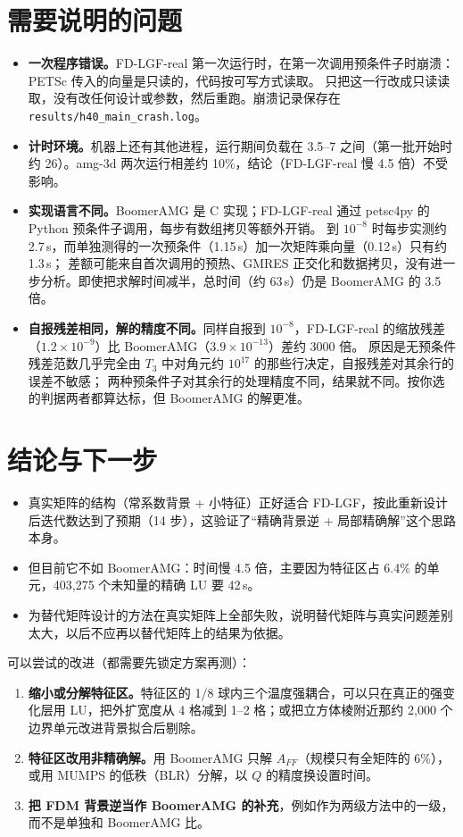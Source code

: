 \documentclass[11pt,a4paper]{ctexart}
\begin{document}
\section{需要说明的问题}
\begin{itemize}
\item \textbf{一次程序错误。}FD-LGF-real 第一次运行时，在第一次调用预条件子时崩溃：PETSc 传入的向量是只读的，代码按可写方式读取。
只把这一行改成只读读取，没有改任何设计或参数，然后重跑。崩溃记录保存在 \texttt{results/h40\_main\_crash.log}。
\item \textbf{计时环境。}机器上还有其他进程，运行期间负载在 3.5--7 之间（第一批开始时约 26）。amg-3d 两次运行相差约 10\%，结论（FD-LGF-real 慢 4.5 倍）不受影响。
\item \textbf{实现语言不同。}BoomerAMG 是 C 实现；FD-LGF-real 通过 petsc4py 的 Python 预条件子调用，每步有数组拷贝等额外开销。
到 $10^{-8}$ 时每步实测约 2.7\,s，而单独测得的一次预条件（1.15\,s）加一次矩阵乘向量（0.12\,s）只有约 1.3\,s；
差额可能来自首次调用的预热、GMRES 正交化和数据拷贝，没有进一步分析。即使把求解时间减半，总时间（约 63\,s）仍是 BoomerAMG 的 3.5 倍。
\item \textbf{自报残差相同，解的精度不同。}同样自报到 $10^{-8}$，FD-LGF-real 的缩放残差（$1.2\times10^{-9}$）比 BoomerAMG（$3.9\times10^{-13}$）差约 3000 倍。
原因是无预条件残差范数几乎完全由 $T_3$ 中对角元约 $10^{17}$ 的那些行决定，自报残差对其余行的误差不敏感；
两种预条件子对其余行的处理精度不同，结果就不同。按你选的判据两者都算达标，但 BoomerAMG 的解更准。
\end{itemize}

\section{结论与下一步}
\begin{itemize}
\item 真实矩阵的结构（常系数背景 + 小特征）正好适合 FD-LGF，按此重新设计后迭代数达到了预期（14 步），这验证了“精确背景逆 + 局部精确解”这个思路本身。
\item 但目前它不如 BoomerAMG：时间慢 4.5 倍，主要因为特征区占 6.4\% 的单元，403,275 个未知量的精确 LU 要 42\,s。
\item 为替代矩阵设计的方法在真实矩阵上全部失败，说明替代矩阵与真实问题差别太大，以后不应再以替代矩阵上的结果为依据。
\end{itemize}
可以尝试的改进（都需要先锁定方案再测）：
\begin{enumerate}
\item \textbf{缩小或分解特征区。}特征区的 1/8 球内三个温度强耦合，可以只在真正的强变化层用 LU，把外扩宽度从 4 格减到 1--2 格；或把立方体棱附近那约 2,000 个边界单元改进背景拟合后剔除。
\item \textbf{特征区改用非精确解。}用 BoomerAMG 只解 $A_{FF}$（规模只有全矩阵的 6\%），或用 MUMPS 的低秩（BLR）分解，以 $Q$ 的精度换设置时间。
\item \textbf{把 FDM 背景逆当作 BoomerAMG 的补充}，例如作为两级方法中的一级，而不是单独和 BoomerAMG 比。
\end{enumerate}
\end{document}
